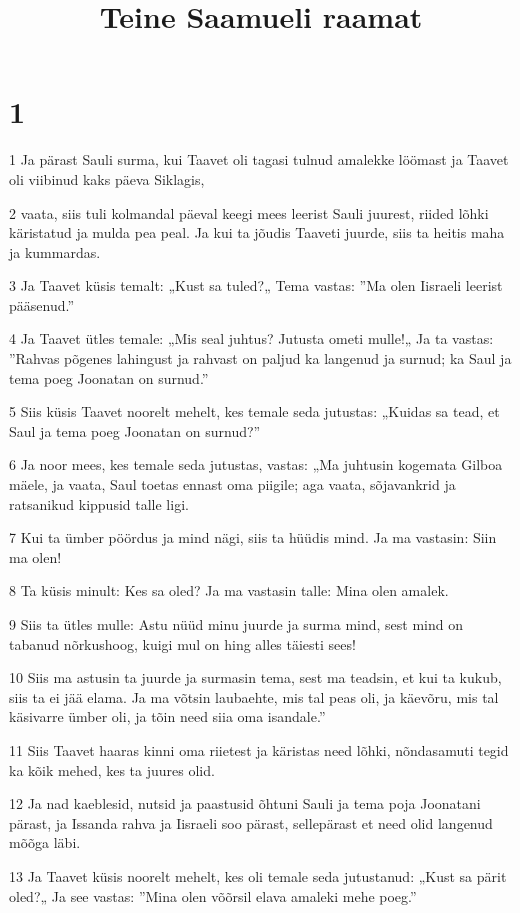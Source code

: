 

\title{Teine Saamueli raamat}

\chapter{1}

\par 1 Ja pärast Sauli surma, kui Taavet oli tagasi tulnud amalekke löömast ja Taavet oli viibinud kaks päeva Siklagis,
\par 2 vaata, siis tuli kolmandal päeval keegi mees leerist Sauli juurest, riided lõhki käristatud ja mulda pea peal. Ja kui ta jõudis Taaveti juurde, siis ta heitis maha ja kummardas.
\par 3 Ja Taavet küsis temalt: „Kust sa tuled?„ Tema vastas: ”Ma olen Iisraeli leerist pääsenud.”
\par 4 Ja Taavet ütles temale: „Mis seal juhtus? Jutusta ometi mulle!„ Ja ta vastas: ”Rahvas põgenes lahingust ja rahvast on paljud ka langenud ja surnud; ka Saul ja tema poeg Joonatan on surnud.”
\par 5 Siis küsis Taavet noorelt mehelt, kes temale seda jutustas: „Kuidas sa tead, et Saul ja tema poeg Joonatan on surnud?”
\par 6 Ja noor mees, kes temale seda jutustas, vastas: „Ma juhtusin kogemata Gilboa mäele, ja vaata, Saul toetas ennast oma piigile; aga vaata, sõjavankrid ja ratsanikud kippusid talle ligi.
\par 7 Kui ta ümber pöördus ja mind nägi, siis ta hüüdis mind. Ja ma vastasin: Siin ma olen!
\par 8 Ta küsis minult: Kes sa oled? Ja ma vastasin talle: Mina olen amalek.
\par 9 Siis ta ütles mulle: Astu nüüd minu juurde ja surma mind, sest mind on tabanud nõrkushoog, kuigi mul on hing alles täiesti sees!
\par 10 Siis ma astusin ta juurde ja surmasin tema, sest ma teadsin, et kui ta kukub, siis ta ei jää elama. Ja ma võtsin laubaehte, mis tal peas oli, ja käevõru, mis tal käsivarre ümber oli, ja tõin need siia oma isandale.”
\par 11 Siis Taavet haaras kinni oma riietest ja käristas need lõhki, nõndasamuti tegid ka kõik mehed, kes ta juures olid.
\par 12 Ja nad kaeblesid, nutsid ja paastusid õhtuni Sauli ja tema poja Joonatani pärast, ja Issanda rahva ja Iisraeli soo pärast, sellepärast et need olid langenud mõõga läbi.
\par 13 Ja Taavet küsis noorelt mehelt, kes oli temale seda jutustanud: „Kust sa pärit oled?„ Ja see vastas: ”Mina olen võõrsil elava amaleki mehe poeg.”
